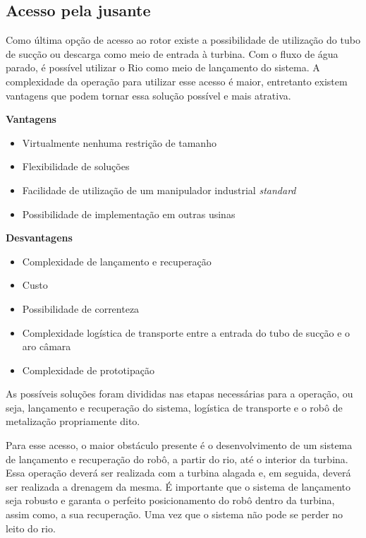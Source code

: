 \subsection{Acesso pela jusante}


Como última opção de acesso ao rotor existe a possibilidade de utilização do
tubo de sucção ou descarga como meio de entrada à turbina. Com o fluxo de água
parado, é possível utilizar o Rio como meio de lançamento do sistema. A
complexidade da operação para utilizar esse acesso é maior, entretanto existem
vantagens que podem tornar essa solução possível e mais atrativa.

\textbf{Vantagens}
\begin{itemize}
  \item Virtualmente nenhuma restrição de tamanho
  \item Flexibilidade de soluções
  \item Facilidade de utilização de um manipulador industrial \textit{standard}
  \item Possibilidade de implementação em outras usinas
\end{itemize}

\textbf{Desvantagens}
\begin{itemize}
  \item Complexidade de lançamento e recuperação
  \item Custo
  \item Possibilidade de correnteza
  \item Complexidade logística de transporte entre a entrada do tubo de sucção e
  o aro câmara
  \item Complexidade de prototipação
\end{itemize}

As possíveis soluções foram divididas nas etapas necessárias para a operação, ou
seja, lançamento e recuperação do sistema, logística de transporte e o robô de
metalização propriamente dito.

Para esse acesso, o maior obstáculo presente é o desenvolvimento de um sistema
de lançamento e recuperação do robô, a partir do rio, até o interior da turbina.
Essa operação deverá ser realizada com a turbina alagada e, em seguida, deverá
ser realizada a drenagem da mesma. É importante que o sistema de lançamento seja
robusto e garanta o perfeito posicionamento do robô dentro da turbina, assim
como, a sua recuperação. Uma vez que o sistema não pode se perder no leito do
rio.


